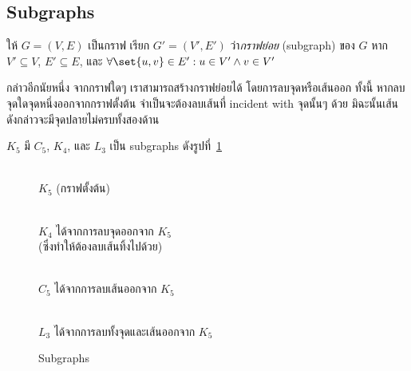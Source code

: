\subsection{Subgraphs}

\begin{definition}
ให้ $G=(V,E)$ เป็นกราฟ \enskip เรียก $G'=(V',E')$ ว่า\emph{กราฟย่อย} (subgraph) ของ $G$ หาก $V'\subseteq V$, $E'\subseteq E$, และ $\forall\set{u,v}\in E': u\in V'\wedge v\in V'$
\end{definition}
%
กล่าวอีกนัยหนึ่ง จากกราฟใดๆ เราสามารถสร้างกราฟย่อยได้ โดยการลบจุดหรือเส้นออก \enskip ทั้งนี้ หากลบจุดใดจุดหนึ่งออกจากกราฟตั้งต้น จำเป็นจะต้องลบเส้นที่ incident with จุดนั้นๆ ด้วย มิฉะนั้นเส้นดังกล่าวจะมีจุดปลายไม่ครบทั้งสองด้าน

\begin{example}
$K_5$ มี $C_5$, $K_4$, และ $L_3$ เป็น subgraphs ดังรูปที่~\ref{fig:subgraphs}

\begin{figure}
\centering
\begin{multicols}{2}
\\
$K_5$ (กราฟตั้งต้น)

\\
$K_4$ ได้จากการลบจุดออกจาก $K_5$\\
(ซึ่งทำให้ต้องลบเส้นทิ้งไปด้วย)
\columnbreak

\\
$C_5$ ได้จากการลบเส้นออกจาก $K_5$

\\
$L_3$ ได้จากการลบทั้งจุดและเส้นออกจาก $K_5$
\end{multicols}
\caption{Subgraphs}
\label{fig:subgraphs}
\end{figure}
\end{example}

